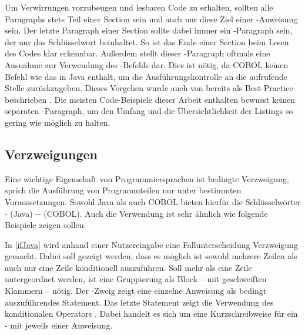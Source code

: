 Um Verwirrungen vorzubeugen und lesbaren Code zu erhalten, sollten alle Paragraphs stets Teil einer Section sein und auch nur diese Ziel einer -Anweisung sein. Der letzte Paragraph einer Section sollte dabei immer ein -Paragraph sein, der nur das Schlüsselwort  beinhaltet. So ist das Ende einer Section beim Lesen des Codes klar erkennbar. Außerdem stellt dieser -Paragraph oftmals eine Ausnahme zur Verwendung des -Befehls dar. Dies ist nötig, da COBOL keinen Befehl wie das  in Java enthält, um die Ausführungskontrolle an die aufrufende Stelle zurückzugeben. Dieses Vorgehen wurde auch von \citeauthor{richards_enhancing_1984} bereits \citeyear{richards_enhancing_1984} als Best-Practice beschrieben  \cite{richards_enhancing_1984}. Die meisten Code-Beispiele dieser Arbeit enthalten bewusst keinen separaten -Paragraph, um den Umfang und die Übersichtlichkeit der Listings so gering wie möglich zu halten. 

\subsection{Verzweigungen}
Eine wichtige Eigenschaft von Programmiersprachen ist bedingte Verzweigung, sprich die Ausführung von Programmteilen nur unter bestimmten Voraussetzungen. Sowohl Java als auch COBOL bieten hierfür die Schlüsselwörter - (Java) \bzw {}-- (COBOL). Auch die Verwendung ist sehr ähnlich wie folgende Beispiele zeigen sollen.


In \autoref{ifJava} wird anhand einer Nutzereingabe eine Fallunterscheidung \bzw Verzweigung gemacht. Dabei soll gezeigt werden, dass es möglich ist sowohl mehrere Zeilen als auch nur eine Zeile konditionell auszuführen. Soll mehr als eine Zeile untergeordnet werden, ist eine Gruppierung als Block -- mit geschweiften Klammern -- nötig. Der -Zweig zeigt eine einzelne Anweisung als bedingt auszuführendes Statement. Das letzte Statement zeigt die Verwendung des konditionalen Operators . Dabei handelt es sich um eine Kurzschreibweise für ein - mit jeweils einer Anweisung. 


